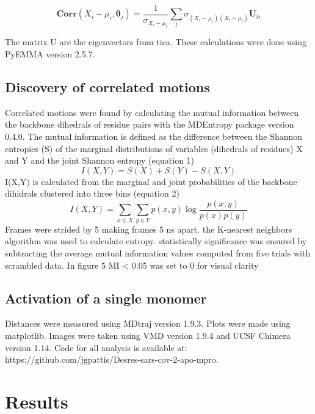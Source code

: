 \documentclass{biophys-new}
\begin{document}
\begin{equation}
\mathbf{Corr}(X_i - \mu_i, \mathbf{\theta}_j) = \frac{1}{\sigma_{X_i - \mu_i}}\sum_l \sigma_{(X_i - \mu_i)(X_l - \mu_l)} \mathbf{U}_{li}    
\end{equation}

The matrix U are the eigenvectors from tica. These calculations were done using PyEMMA version 2.5.7. \cite{scherer2015pyemma}

\subsection*{Discovery of correlated motions}

Correlated motions were found by calculating the mutual information between the backbone dihedrals of residue pairs with the MDEntropy package version 0.4.0.\cite{mdentropy} The mutual information is defined as the difference between the Shannon entropies (S) of the marginal distributions of variables (dihedrals of residues) X and Y and the joint Shannon entropy (equation 1)
\begin{equation}
I(X, Y)=S(X)+S(Y)-S(X, Y)
\end{equation}
I(X,Y) is calculated from the marginal and joint probabilities of the backbone dihidrals clustered into three bins (equation 2)
\begin{equation}
I(X, Y)=\sum_{x \in X} \sum_{y \in Y} p(x, y) \log \frac{p(x, y)}{p(x) p(y)}
\end{equation}
Frames were strided by 5 making frames 5 ns apart. the K-nearest neighbors algorithm was used to calculate entropy. statistically significance was ensured by subtracting the average mutual information values computed from five trials with scrambled data. In figure 5 MI < 0.05 was set to 0 for visual clarity

\subsection*{Activation of a single monomer}

Distances were measured using MDtraj version 1.9.3.\cite{McGibbon2015MDTraj} Plots were made using matplotlib.\cite{Hunter:2007} Images were taken using VMD version 1.9.4\cite{HUMP96} and UCSF Chimera version 1.14.\cite{pettersen2004ucsf} Code for all analysis is available at: https://github.com/jgpattis/Desres-sars-cov-2-apo-mpro.

\section*{Results}
\end{document}
